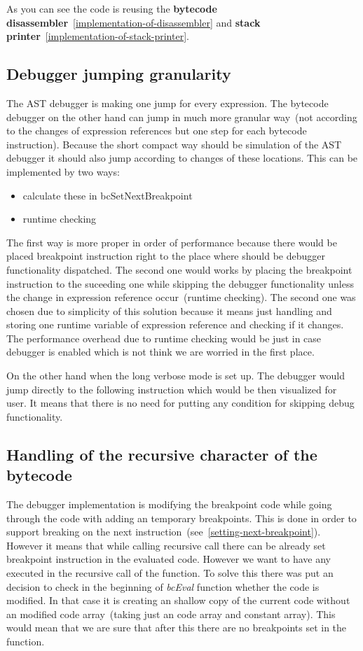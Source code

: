 \documentclass[thesis=M,english]{FITthesis}[2018/10/20]
\begin{document}
As you can see the code is reusing the \textbf{bytecode disassembler}~\ref{implementation-of-disassembler} and \textbf{stack printer}~\ref{implementation-of-stack-printer}.

\subsection{Debugger jumping granularity}\label{debugger-jumping-granuality}

The AST debugger is making one jump for every expression. The bytecode debugger on the other hand can jump in much more granular way~(not according to the changes of expression references but one step for each bytecode instruction). Because the short compact way should be simulation of the AST debugger it should also jump according to changes of these locations. This can be implemented by two ways:

\begin{itemize}
	\item calculate these in bcSetNextBreakpoint
	\item runtime checking
\end{itemize}

The first way is more proper in order of performance because there would be placed breakpoint instruction right to the place where should be debugger functionality dispatched. The second one would works by placing the breakpoint instruction to the suceeding one while skipping the debugger functionality unless the change in expression reference occur~(runtime checking). The second one was chosen due to simplicity of this solution because it means just handling and storing one runtime variable of expression reference and checking if it changes. The performance overhead due to runtime checking would be just in case debugger is enabled which is not think we are worried in the first place.

On the other hand when the long verbose mode is set up. The debugger would jump directly to the following instruction which would be then visualized for user. It means that there is no need for putting any condition for skipping debug functionality.

\subsection{Handling of the recursive character of the bytecode}

The debugger implementation is modifying the breakpoint code  while going through the code with adding an temporary breakpoints. This is done in order to support breaking on the next instruction~(see~\ref{setting-next-breakpoint}). However it means that while calling recursive call there can be already set breakpoint instruction in the evaluated code. However we want to have any executed in the recursive call of the function. To solve this there was put an decision to check in the beginning of \textit{bcEval} function whether the code is modified. In that case it is creating an shallow copy of the current code without an modified code array~(taking just an code array and constant array). This would mean that we are sure that after this there are no breakpoints set in the function.
\end{document}

